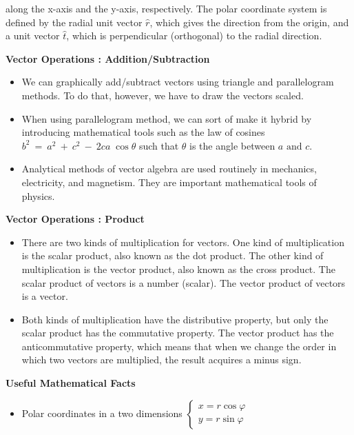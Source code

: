 \documentclass[12pt,addpoints]{exam}
\begin{document}
\begin{questions}
\begin{itemize}
			along the x-axis and the y-axis, respectively. The polar coordinate system is defined by the radial unit vector  $\hat{r}$, which gives the direction from the origin, and a unit vector  $\hat{t}$, which is perpendicular (orthogonal) to the radial direction.
		\end{itemize}
		\begin{center}
			\textbf{Vector Operations : Addition/Subtraction} 
		\end{center}
		\begin{itemize}
			\item We can graphically add/subtract vectors using triangle and parallelogram methods. To do that, however, we have to draw the vectors scaled.
			\item When using parallelogram method, we can sort of make it hybrid by introducing mathematical tools such as the law of cosines $b^2 ~=~ a^2 ~+~ c^2 ~-~ 2ca\;\cos\theta$ such that $\theta$ is the angle between $a\text{ and }c$. 
			\item Analytical methods of vector algebra are used routinely in mechanics, electricity, and magnetism. They are important mathematical tools of physics.
	   \end{itemize}
	   \begin{center}
		\textbf{Vector Operations : Product} 
	   \end{center}
   	   \begin{itemize}
   	   	\item There are two kinds of multiplication for vectors. One kind of multiplication is the scalar product, also known as the dot product. The other kind of multiplication is the vector product, also known as the cross product. The scalar product of vectors is a number (scalar). The vector product of vectors is a vector.
   	   	\item Both kinds of multiplication have the distributive property, but only the scalar product has the commutative property. The vector product has the anticommutative property, which means that when we change the order in which two vectors are multiplied, the result acquires a minus sign.
	   \end{itemize}
   		\begin{center}
   			\textbf{Useful Mathematical Facts} 
   		\end{center}
   		\begin{itemize}
   			\item Polar coordinates in a two dimensions $\begin{cases} x = r \cos \varphi \\ y = r \sin \varphi \end{cases}$

\end{itemize}
\end{questions}
\end{document}
